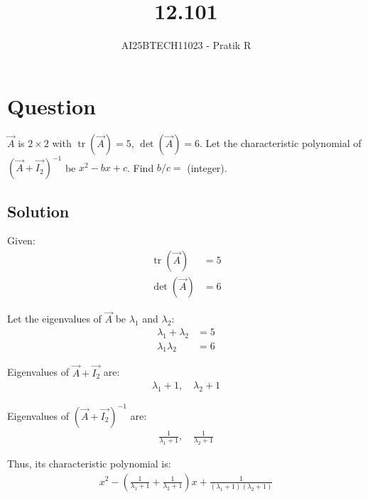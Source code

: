 \documentclass[journal]{IEEEtran}
\begin{document}

\vspace{3cm}

\title{12.101}
\author{AI25BTECH11023 - Pratik R}
{\let\newpage\relax\maketitle}

\renewcommand{\thefigure}{\theenumi}
\renewcommand{\thetable}{\theenumi}
\setlength{\intextsep}{10pt} %


\renewcommand{\thetable}{\theenumi}


\section*{\textbf{Question}}

$\vec{A}$ is $2\times2$ with $\operatorname{tr}(\vec{A}) = 5$, $\det(\vec{A}) = 6$. Let the characteristic polynomial of $(\vec{A} + \vec{I_2})^{-1}$ be $x^2 - bx + c$. Find $b/c =$ (integer).

\subsection*{\textbf{Solution}}
Given:
\begin{align}
\operatorname{tr}(\vec{A}) &= 5 \\
\det(\vec{A}) &= 6
\end{align}

Let the eigenvalues of $\vec{A}$ be $\lambda_1$ and $\lambda_2$:
\begin{align}
\lambda_1 + \lambda_2 &= 5 \\
\lambda_1 \lambda_2 &= 6
\end{align}

Eigenvalues of $\vec{A} + \vec{I_2}$ are:
\begin{align}
\lambda_1 + 1,\quad \lambda_2 + 1
\end{align}

Eigenvalues of $(\vec{A} + \vec{I_2})^{-1}$ are:
\begin{align}
\frac{1}{\lambda_1 + 1},\quad \frac{1}{\lambda_2 + 1}
\end{align}

Thus, its characteristic polynomial is:
\begin{align}
x^2 - \left(\frac{1}{\lambda_1 + 1} + \frac{1}{\lambda_2 + 1}\right)x + \frac{1}{(\lambda_1 + 1)(\lambda_2 + 1)}
\end{align}
\end{document}
